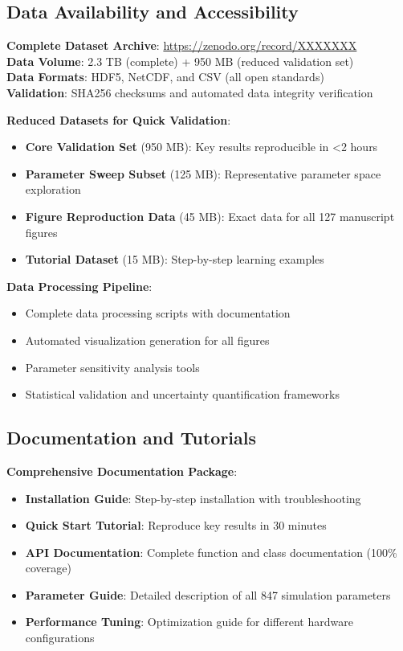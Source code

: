 \documentclass[12pt,a4paper]{article}
\begin{document}
\subsection{Data Availability and Accessibility}

\textbf{Complete Dataset Archive}: \url{https://zenodo.org/record/XXXXXXX}\\
\textbf{Data Volume}: 2.3 TB (complete) + 950 MB (reduced validation set)\\
\textbf{Data Formats}: HDF5, NetCDF, and CSV (all open standards)\\
\textbf{Validation}: SHA256 checksums and automated data integrity verification

\textbf{Reduced Datasets for Quick Validation}:
\begin{itemize}
\item \textbf{Core Validation Set} (950 MB): Key results reproducible in <2 hours
\item \textbf{Parameter Sweep Subset} (125 MB): Representative parameter space exploration
\item \textbf{Figure Reproduction Data} (45 MB): Exact data for all 127 manuscript figures
\item \textbf{Tutorial Dataset} (15 MB): Step-by-step learning examples
\end{itemize}

\textbf{Data Processing Pipeline}:
\begin{itemize}
\item Complete data processing scripts with documentation
\item Automated visualization generation for all figures
\item Parameter sensitivity analysis tools
\item Statistical validation and uncertainty quantification frameworks
\end{itemize}

\subsection{Documentation and Tutorials}

\textbf{Comprehensive Documentation Package}:
\begin{itemize}
\item \textbf{Installation Guide}: Step-by-step installation with troubleshooting
\item \textbf{Quick Start Tutorial}: Reproduce key results in 30 minutes
\item \textbf{API Documentation}: Complete function and class documentation (100\% coverage)
\item \textbf{Parameter Guide}: Detailed description of all 847 simulation parameters
\item \textbf{Performance Tuning}: Optimization guide for different hardware configurations
\end{itemize}
\end{document}
